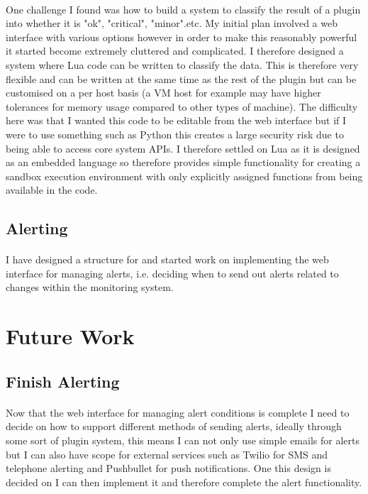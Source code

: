 \documentclass[bsc,logo,twoside]{infthesis}
\begin{document}
\paragraph*{}
	One challenge I found was how to build a system to classify the result of a
	plugin into whether it is "ok", "critical", "minor".etc.  My initial plan
	involved a web interface with various options however in order to make this
	reasonably powerful it started become extremely cluttered and complicated. I
	therefore designed a system where Lua code can be written to classify the
	data.  This is therefore very flexible and can be written at the same time
	as the rest of the plugin but can be customised on a per host basis (a VM
	host for example may have higher tolerances for memory usage compared to
	other types of machine).  The difficulty here was that I wanted this code to
	be editable from the web interface but if I were to use something such as
	Python this creates a large security risk due to being able to access core
	system APIs. I therefore settled on Lua as it is designed as an embedded
	language so therefore provides simple functionality for creating a sandbox
	execution environment with only explicitly assigned functions from being
	available in the code.
	
\subsection{Alerting}
\paragraph*{}
	I have designed a structure for and started work on implementing the web
	interface for managing alerts, i.e. deciding when to send out alerts related
	to changes within the monitoring system.

\section{Future Work}
\subsection{Finish Alerting}
\paragraph*{}
	Now that the web interface for managing alert conditions is complete I need to
	decide on how to support different methods of sending alerts, ideally through
	some sort of plugin system, this means I can not only use simple emails for
	alerts but I can also have scope for external services such as Twilio for SMS
	and telephone alerting and Pushbullet for push notifications.  One this design
	is decided on I can then implement it and therefore complete the alert
	functionality.
\end{document}

